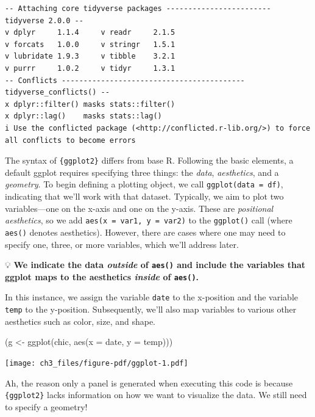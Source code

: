 \documentclass[
  letterpaper,
  DIV=11,
  numbers=noendperiod]{scrreprt}
\newenvironment{Shaded}{\begin{snugshade}}{\end{snugshade}}
\newcommand{\AttributeTok}[1]{\textcolor[rgb]{0.40,0.45,0.13}{#1}}
\newcommand{\FunctionTok}[1]{\textcolor[rgb]{0.28,0.35,0.67}{#1}}
\newcommand{\NormalTok}[1]{\textcolor[rgb]{0.00,0.23,0.31}{#1}}
\newcommand{\OtherTok}[1]{\textcolor[rgb]{0.00,0.23,0.31}{#1}}
\begin{document}
\begin{verbatim}
-- Attaching core tidyverse packages ------------------------ tidyverse 2.0.0 --
v dplyr     1.1.4     v readr     2.1.5
v forcats   1.0.0     v stringr   1.5.1
v lubridate 1.9.3     v tibble    3.2.1
v purrr     1.0.2     v tidyr     1.3.1
-- Conflicts ------------------------------------------ tidyverse_conflicts() --
x dplyr::filter() masks stats::filter()
x dplyr::lag()    masks stats::lag()
i Use the conflicted package (<http://conflicted.r-lib.org/>) to force all conflicts to become errors
\end{verbatim}

The syntax of \texttt{\{ggplot2\}} differs from base R. Following the
basic elements, a default ggplot requires specifying three things: the
\emph{data}, \emph{aesthetics}, and a \emph{geometry}. To begin defining
a plotting object, we call \texttt{ggplot(data\ =\ df)}, indicating that
we'll work with that dataset. Typically, we aim to plot two
variables---one on the x-axis and one on the y-axis. These are
\emph{positional aesthetics}, so we add
\texttt{aes(x\ =\ var1,\ y\ =\ var2)} to the \texttt{ggplot()} call
(where \texttt{aes()} denotes aesthetics). However, there are cases
where one may need to specify one, three, or more variables, which we'll
address later.

💡 \textbf{We indicate the data \emph{outside} of \texttt{aes()} and
include the variables that ggplot maps to the aesthetics \emph{inside}
of \texttt{aes()}.}

In this instance, we assign the variable \texttt{date} to the x-position
and the variable \texttt{temp} to the y-position. Subsequently, we'll
also map variables to various other aesthetics such as color, size, and
shape.

\begin{Shaded}
\begin{Highlighting}[]
\NormalTok{(g }\OtherTok{\textless{}{-}} \FunctionTok{ggplot}\NormalTok{(chic, }\FunctionTok{aes}\NormalTok{(}\AttributeTok{x =}\NormalTok{ date, }\AttributeTok{y =}\NormalTok{ temp)))}
\end{Highlighting}
\end{Shaded}

\texttt{[image: ch3\_files/figure-pdf/ggplot-1.pdf]}

Ah, the reason only a panel is generated when executing this code is
because \texttt{\{ggplot2\}} lacks information on how we want to
visualize the data. We still need to specify a geometry!
\end{document}

